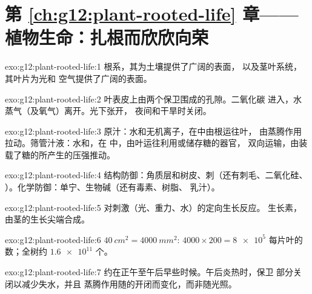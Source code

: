 \section*{第 \ref{ch:g12:plant-rooted-life} 章——植物生命：扎根而欣欣向荣}

\begin{solution}{exo:g12:plant-rooted-life:1}
根系，其为土壤提供了广阔的表面，
以及茎叶系统，其叶片为光和
空气提供了广阔的表面。
\end{solution}

\begin{solution}{exo:g12:plant-rooted-life:2}
叶表皮上由两个保卫围成的孔隙。二氧化碳
进入，水蒸气（及氧气）离开。光下张开，
夜间和干旱时关闭。
\end{solution}

\begin{solution}{exo:g12:plant-rooted-life:3}
原汁：水和无机离子，在中由根运往叶，
由蒸腾作用拉动。筛管汁液：水和，在
中，由叶运往利用或储存糖的器官，
双向运输，由装载了糖的所产生的压强推动。
\end{solution}

\begin{solution}{exo:g12:plant-rooted-life:4}
结构防御：角质层和树皮、刺（还有刺毛、二氧化硅、
）。化学防御：单宁、生物碱（还有毒素、树脂、
乳汁）。
\end{solution}

\begin{solution}{exo:g12:plant-rooted-life:5}
对刺激（光、重力、水）的定向生长反应。
生长素，由茎的生长尖端合成。
\end{solution}

\begin{solution}{exo:g12:plant-rooted-life:6}
$\qty{40}{cm^2} = \qty{4000}{mm^2}$: $4000 \times 200 = \num{8e5}$
每片叶的数；全树约 $\num{1.6e11}$ 个。
\end{solution}

\begin{solution}{exo:g12:plant-rooted-life:7}
约在正午至午后早些时候。午后炎热时，保卫
部分关闭以减少失水，并且
蒸腾作用随的开闭而变化，而非随光照。
\end{solution}

